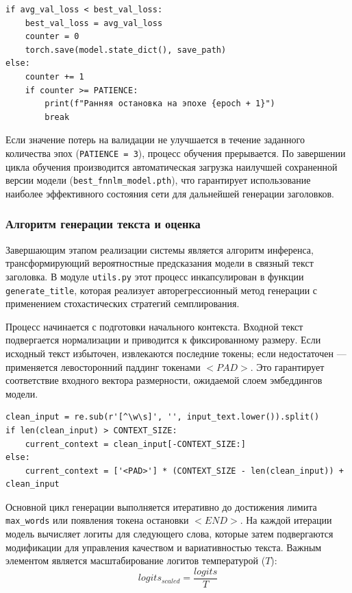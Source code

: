 \documentclass[coursework]{SCWorks}
\begin{document}
    \begin{verbatim}
if avg_val_loss < best_val_loss:
    best_val_loss = avg_val_loss
    counter = 0
    torch.save(model.state_dict(), save_path)
else:
    counter += 1
    if counter >= PATIENCE:
        print(f"Ранняя остановка на эпохе {epoch + 1}")
        break
    \end{verbatim}

    Если значение потерь на валидации не улучшается в течение заданного количества эпох (\texttt{PATIENCE = 3}), процесс обучения прерывается. По завершении цикла обучения производится автоматическая загрузка наилучшей сохраненной версии модели (\texttt{best\_fnnlm\_model.pth}), что гарантирует использование наиболее эффективного состояния сети для дальнейшей генерации заголовков.

    \subsubsection{Алгоритм генерации текста и оценка}

    Завершающим этапом реализации системы является алгоритм инференса, трансформирующий вероятностные предсказания модели в связный текст заголовка. В модуле \texttt{utils.py} этот процесс инкапсулирован в функции \texttt{generate\_title}, которая реализует авторегрессионный метод генерации с применением стохастических стратегий семплирования.

    Процесс начинается с подготовки начального контекста. Входной текст подвергается нормализации и приводится к фиксированному размеру. Если исходный текст избыточен, извлекаются последние токены; если недостаточен — применяется левосторонний паддинг токенами $<PAD>$. Это гарантирует соответствие входного вектора размерности, ожидаемой слоем эмбеддингов модели.

    \begin{verbatim}
clean_input = re.sub(r'[^\w\s]', '', input_text.lower()).split()
if len(clean_input) > CONTEXT_SIZE:
    current_context = clean_input[-CONTEXT_SIZE:]
else:
    current_context = ['<PAD>'] * (CONTEXT_SIZE - len(clean_input)) + clean_input
    \end{verbatim}

    Основной цикл генерации выполняется итеративно до достижения лимита \texttt{max\_words} или появления токена остановки $<END>$. На каждой итерации модель вычисляет логиты для следующего слова, которые затем подвергаются модификации для управления качеством и вариативностью текста. Важным элементом является масштабирование логитов температурой ($T$):
    \[ logits_{scaled} = \frac{logits}{T} \]
\end{document}
